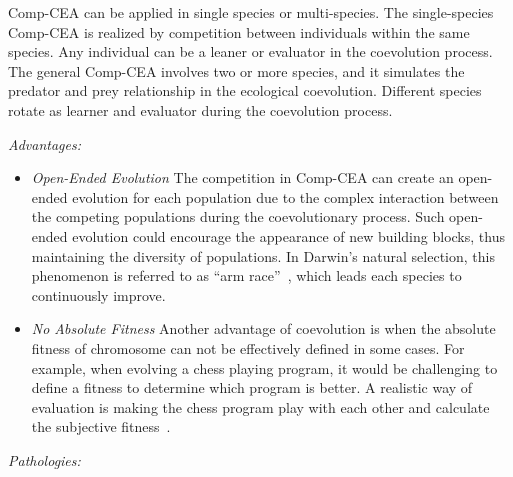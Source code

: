 Comp-CEA can be applied in single species or multi-species. The single-species Comp-CEA is realized by competition between individuals within the same species. Any individual can be a leaner or evaluator in the coevolution process. The general Comp-CEA involves two or more species, and it simulates the predator and prey relationship in the ecological coevolution. Different species rotate as learner and evaluator during the coevolution process.

\textit{Advantages:} 

\begin{itemize}
\item \textit{Open-Ended Evolution} The competition in Comp-CEA can create an open-ended evolution for each population due to the complex interaction between the competing populations during the coevolutionary process. Such open-ended evolution could encourage the appearance of new building blocks, thus maintaining the diversity of populations. In Darwin's natural selection, this phenomenon is referred to as ``arm race''~\cite{Dawkins_1979}, which leads each species to continuously improve.  %

\item \textit{No Absolute Fitness} Another advantage of coevolution is when the absolute fitness of chromosome can not be effectively defined in some cases. For example, when evolving a chess playing program, it would be challenging to define a fitness to determine which program is better. A realistic way of evaluation is making the chess program play with each other and calculate the subjective fitness~\cite{Angeline_1993, David2014}. 
\end{itemize}

\textit{Pathologies:} 


